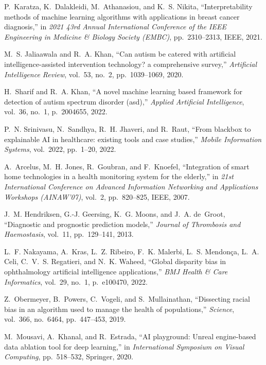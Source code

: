 \documentclass{article}
\begin{document}
\begin{thebibliography}{100}
	P.~Karatza, K.~Dalakleidi, M.~Athanasiou, and K.~S. Nikita, ``Interpretability
	methods of machine learning algorithms with applications in breast cancer
	diagnosis,'' in {\em 2021 43rd Annual International Conference of the IEEE
		Engineering in Medicine \& Biology Society (EMBC)}, pp.~2310--2313, IEEE,
	2021.
	
	M.~S. Jaliaawala and R.~A. Khan, ``Can autism be catered with artificial
	intelligence-assisted intervention technology? a comprehensive survey,'' {\em
		Artificial Intelligence Review}, vol.~53, no.~2, pp.~1039--1069, 2020.
	
	H.~Sharif and R.~A. Khan, ``A novel machine learning based framework for
	detection of autism spectrum disorder (asd),'' {\em Applied Artificial
		Intelligence}, vol.~36, no.~1, p.~2004655, 2022.
	
	P.~N. Srinivasu, N.~Sandhya, R.~H. Jhaveri, and R.~Raut, ``From blackbox to
	explainable {AI} in healthcare: existing tools and case studies,'' {\em
		Mobile Information Systems}, vol.~2022, pp.~1--20, 2022.
	
	A.~Arcelus, M.~H. Jones, R.~Goubran, and F.~Knoefel, ``Integration of smart
	home technologies in a health monitoring system for the elderly,'' in {\em
		21st International Conference on Advanced Information Networking and
		Applications Workshops (AINAW'07)}, vol.~2, pp.~820--825, IEEE, 2007.
	
	J.~M. Hendriksen, G.-J. Geersing, K.~G. Moons, and J.~A. de~Groot, ``Diagnostic
	and prognostic prediction models,'' {\em Journal of Thrombosis and
		Haemostasis}, vol.~11, pp.~129--141, 2013.
	
	L.~F. Nakayama, A.~Kras, L.~Z. Ribeiro, F.~K. Malerbi, L.~S. Mendon{\c{c}}a,
	L.~A. Celi, C.~V.~S. Regatieri, and N.~K. Waheed, ``Global disparity bias in
	ophthalmology artificial intelligence applications,'' {\em BMJ Health \& Care
		Informatics}, vol.~29, no.~1, p.~e100470, 2022.
	
	Z.~Obermeyer, B.~Powers, C.~Vogeli, and S.~Mullainathan, ``Dissecting racial
	bias in an algorithm used to manage the health of populations,'' {\em
		Science}, vol.~366, no.~6464, pp.~447--453, 2019.
	
	M.~Mousavi, A.~Khanal, and R.~Estrada, ``{AI} playground: Unreal engine-based
	data ablation tool for deep learning,'' in {\em International Symposium on
		Visual Computing}, pp.~518--532, Springer, 2020.
	

\end{thebibliography}
\end{document}
